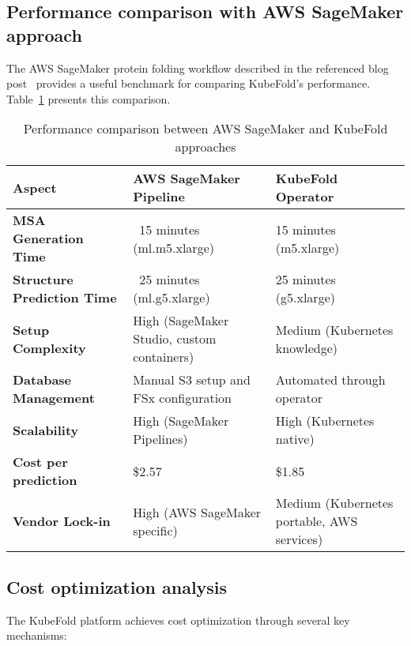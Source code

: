 \subsection{Performance comparison with AWS SageMaker approach}

The AWS SageMaker protein folding workflow described in the referenced blog post~\cite{aws-sagemaker-protein-folding} provides a useful benchmark for comparing KubeFold's performance. Table~\ref{tab:sagemaker_comparison} presents this comparison.

\begin{table}[H]
    \centering
    \small
    \begin{tabularx}{\textwidth}{|X|X|X|}
        \hline
        \textbf{Aspect} & \textbf{AWS SageMaker Pipeline} & \textbf{KubeFold Operator} \\
        \hline
        \textbf{MSA Generation Time} & ~15 minutes (ml.m5.xlarge) & 15 minutes (m5.xlarge) \\
        \hline
        \textbf{Structure Prediction Time} & ~25 minutes (ml.g5.xlarge) & 25 minutes (g5.xlarge) \\
        \hline
        \textbf{Setup Complexity} & High (SageMaker Studio, custom containers) & Medium (Kubernetes knowledge) \\
        \hline
        \textbf{Database Management} & Manual S3 setup and FSx configuration & Automated through operator \\
        \hline
        \textbf{Scalability} & High (SageMaker Pipelines) & High (Kubernetes native) \\
        \hline
        \textbf{Cost per prediction} & \$2.57 & \$1.85 \\
        \hline
        \textbf{Vendor Lock-in} & High (AWS SageMaker specific) & Medium (Kubernetes portable, AWS services) \\
        \hline
    \end{tabularx}
    \caption{Performance comparison between AWS SageMaker and KubeFold approaches}
    \label{tab:sagemaker_comparison}
\end{table}

\subsection{Cost optimization analysis}

The KubeFold platform achieves cost optimization through several key mechanisms:

